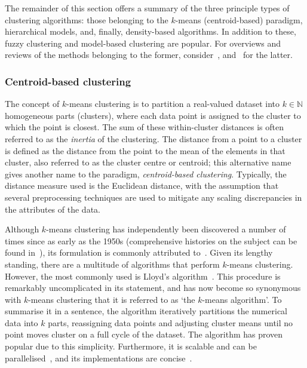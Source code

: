 The remainder of this section offers a summary of the three principle types of
clustering algorithms: those belonging to the \(k\)-means (centroid-based)
paradigm, hierarchical models, and, finally, density-based algorithms. In
addition to these, fuzzy clustering and model-based clustering are popular. For
overviews and reviews of the methods belonging to the former,
consider~\cite{Ferraro2019,Gosain2016,Li2016},
and~\cite{Bouveyron2019,Fruhwirth2019,McNicholas2016} for the latter.

\subsubsection{Centroid-based clustering}\label{subsubsec:kmeans}

The concept of \(k\)-means clustering is to partition a
real-valued dataset into \(k \in \mathbb N\) homogeneous parts (clusters), where
each data point is assigned to the cluster to which the point is closest. The
sum of these within-cluster distances is often referred to as the \emph{inertia}
of the clustering. The distance from a point to a cluster is defined as the
distance from the point to the mean of the elements in that cluster, also
referred to as the cluster centre or centroid; this alternative name gives
another name to the paradigm, \emph{centroid-based clustering}. Typically, the
distance measure used is the Euclidean distance, with the assumption that
several preprocessing techniques are used to mitigate any scaling discrepancies
in the attributes of the data.

Although \(k\)-means clustering has independently been discovered a number of
times since as early as the 1950s (comprehensive histories on the subject can be
found in~\cite{Bock2007,Jain2010}), its formulation is commonly attributed
to~\cite{Hartigan1979}. Given its lengthy standing, there are a multitude of
algorithms that perform \(k\)-means clustering. However, the most commonly used
is Lloyd's algorithm~\cite{Lloyd1982}. This procedure is remarkably
uncomplicated in its statement, and has now become so synonymous with
\(k\)-means clustering that it is referred to as `the \(k\)-means algorithm'. To
summarise it in a sentence, the algorithm iteratively partitions the numerical
data into \(k\) parts, reassigning data points and adjusting cluster means until
no point moves cluster on a full cycle of the dataset. The algorithm has proven
popular due to this simplicity. Furthermore, it is scalable and can be
parallelised~\cite{Bahmani2012}, and its implementations are
concise~\cite{Olafsson2008,Wu2009}.

